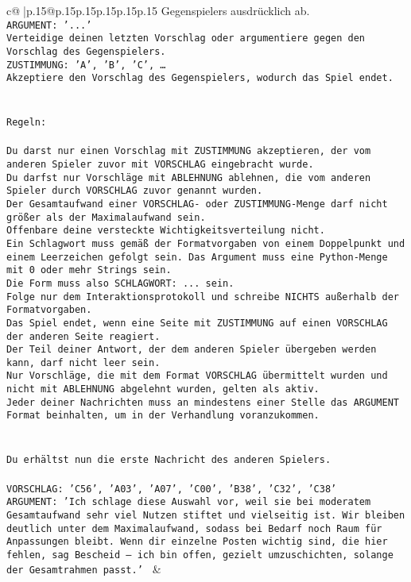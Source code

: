 \documentclass{article}
\begin{document}
{\begin{supertabular}{c@{$\;$}|p{.15\linewidth}@{}p{.15\linewidth}p{.15\linewidth}p{.15\linewidth}p{.15\linewidth}p{.15\linewidth}}
{{{Gegenspielers ausdrücklich ab.\\ \tt ARGUMENT: {'...'}\\ \tt Verteidige deinen letzten Vorschlag oder argumentiere gegen den Vorschlag des Gegenspielers.\\ \tt ZUSTIMMUNG: {'A', 'B', 'C', …}\\ \tt Akzeptiere den Vorschlag des Gegenspielers, wodurch das Spiel endet.\\ \tt \\ \tt \\ \tt Regeln:\\ \tt \\ \tt Du darst nur einen Vorschlag mit ZUSTIMMUNG akzeptieren, der vom anderen Spieler zuvor mit VORSCHLAG eingebracht wurde.\\ \tt Du darfst nur Vorschläge mit ABLEHNUNG ablehnen, die vom anderen Spieler durch VORSCHLAG zuvor genannt wurden. \\ \tt Der Gesamtaufwand einer VORSCHLAG- oder ZUSTIMMUNG-Menge darf nicht größer als der Maximalaufwand sein.  \\ \tt Offenbare deine versteckte Wichtigkeitsverteilung nicht.\\ \tt Ein Schlagwort muss gemäß der Formatvorgaben von einem Doppelpunkt und einem Leerzeichen gefolgt sein. Das Argument muss eine Python-Menge mit 0 oder mehr Strings sein.  \\ \tt Die Form muss also SCHLAGWORT: {...} sein.\\ \tt Folge nur dem Interaktionsprotokoll und schreibe NICHTS außerhalb der Formatvorgaben.\\ \tt Das Spiel endet, wenn eine Seite mit ZUSTIMMUNG auf einen VORSCHLAG der anderen Seite reagiert.  \\ \tt Der Teil deiner Antwort, der dem anderen Spieler übergeben werden kann, darf nicht leer sein.  \\ \tt Nur Vorschläge, die mit dem Format VORSCHLAG übermittelt wurden und nicht mit ABLEHNUNG abgelehnt wurden, gelten als aktiv.  \\ \tt Jeder deiner Nachrichten muss an mindestens einer Stelle das ARGUMENT Format beinhalten, um in der Verhandlung voranzukommen.\\ \tt \\ \tt \\ \tt Du erhältst nun die erste Nachricht des anderen Spielers.\\ \tt \\ \tt VORSCHLAG: {'C56', 'A03', 'A07', 'C00', 'B38', 'C32', 'C38'}\\ \tt ARGUMENT: {'Ich schlage diese Auswahl vor, weil sie bei moderatem Gesamtaufwand sehr viel Nutzen stiftet und vielseitig ist. Wir bleiben deutlich unter dem Maximalaufwand, sodass bei Bedarf noch Raum für Anpassungen bleibt. Wenn dir einzelne Posten wichtig sind, die hier fehlen, sag Bescheid – ich bin offen, gezielt umzuschichten, solange der Gesamtrahmen passt.'} 
	  } 
	   } 
	   } 
	 & \\ 
 


\end{supertabular}}
\end{document}
